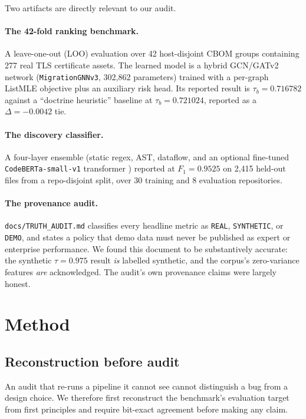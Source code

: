 \documentclass[conference]{IEEEtran}
\newcommand{\code}[1]{\texttt{\small #1}}
\begin{document}
Two artifacts are directly relevant to our audit.

\paragraph{The 42-fold ranking benchmark.} A leave-one-out (LOO) evaluation over 42
host-disjoint CBOM groups containing 277 real TLS certificate assets. The learned model is
a hybrid GCN/GATv2 network (\code{MigrationGNNv3}, 302{,}862 parameters) trained with a
per-graph ListMLE objective plus an auxiliary risk head. Its reported result is
$\tau_b=0.716782$ against a ``doctrine heuristic'' baseline at $\tau_b=0.721024$, reported
as a $\Delta=-0.0042$ tie.

\paragraph{The discovery classifier.} A four-layer ensemble (static regex, AST, dataflow,
and an optional fine-tuned \code{CodeBERTa-small-v1} transformer \cite{codeberta}) reported
at $F_1=0.9525$ on 2{,}415 held-out files from a repo-disjoint split, over 30 training and
8 evaluation repositories.

\paragraph{The provenance audit.} \code{docs/TRUTH\_AUDIT.md} classifies every headline
metric as \code{REAL}, \code{SYNTHETIC}, or \code{DEMO}, and states a policy that demo data
must never be published as expert or enterprise performance. We found this document to be
substantively accurate: the synthetic $\tau=0.975$ result \emph{is} labelled synthetic,
and the corpus's zero-variance features \emph{are} acknowledged. The audit's own
provenance claims were largely honest.

\section{Method}

\label{sec:method}

\subsection{Reconstruction before audit}

An audit that re-runs a pipeline it cannot see cannot distinguish a bug from a design
choice. We therefore first reconstruct the benchmark's evaluation target from first
principles and require bit-exact agreement before making any claim.
\end{document}
